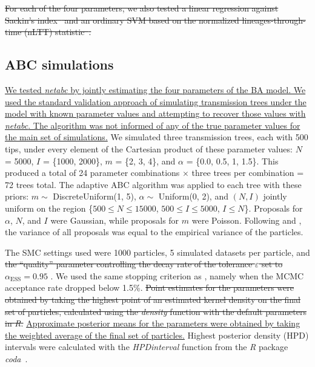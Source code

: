 \documentclass[12pt]{article}\usepackage[]{graphicx}\usepackage[]{color}
\let\mciteauthor\citeauthor
\renewcommand{\citeauthor}[1]{\mbox{\mciteauthor{#1}}}
\newcommand{\add}[1]{\color{blue} \uline{#1} \color{black}}
\newcommand{\del}[1]{\color{red} \sout{#1} \color{black}}
\begin{document}
\del{For each of the four parameters, we also tested a linear regression against
Sackin's index~\autocite{shao1990tree} and an ordinary SVM based on the normalized
lineages-through-time (nLTT) statistic~\autocite{janzen2015approximate}.}

\subsection*{ABC simulations}
  
\add{We tested \textit{netabc} by jointly estimating the four parameters of the
BA model. We used the standard validation approach of simulating transmission
trees under the model with known parameter values and attempting to recover
those values with \textit{netabc}. The algorithm was not informed of any of
the true parameter values for the main set of simulations.} We simulated three
transmission trees, each with 500 tips, under every element of the Cartesian
product of these parameter values: $N$ = 5000, $I$ = \{1000, 2000\}, $m$ = \{2,
3, 4\}, and $\alpha$ = \{0.0, 0.5, 1, 1.5\}. This produced a total of 24
parameter combinations $\times$ three trees per combination = 72 trees total.
The adaptive ABC algorithm was applied to each tree with these priors: $m \sim$
DiscreteUniform(1, 5), $\alpha \sim$ Uniform(0, 2), and $(N, I)$ jointly
uniform on the region \{$500 \leq N \leq 15000$, $500 \leq I \leq 5000$, $I
\leq N$\}. Proposals for $\alpha$, $N$, and $I$ were Gaussian, while proposals
for $m$ were Poisson. Following \textcite{del2012adaptive} and
\textcite{beaumont2009adaptive}, the variance of all proposals was equal to the
empirical variance of the particles.

The SMC settings used were 1000 particles, 5 simulated datasets per particle,
and \del{the ``quality'' parameter controlling the decay rate of the tolerance
$\varepsilon$ set to}\add{$\alpha_{\text{ESS}} =  0.95$}. We used the same
stopping criterion as \citeauthor{del2012adaptive}, namely when the MCMC
acceptance rate dropped below 1.5\%. \del{Point estimates for the parameters
were obtained by taking the highest point of an estimated kernel density on the
final set of particles, calculated using the \textit{density} function with the
default parameters in \textit{R}.} \add{Approximate posterior means for the
parameters were obtained by taking the weighted average of the final set of
particles.} Highest posterior density (HPD) intervals were calculated with the
\textit{HPDinterval} function from the \textit{R} package
\textit{coda}~\autocite{plummer2006coda}.
\end{document}
